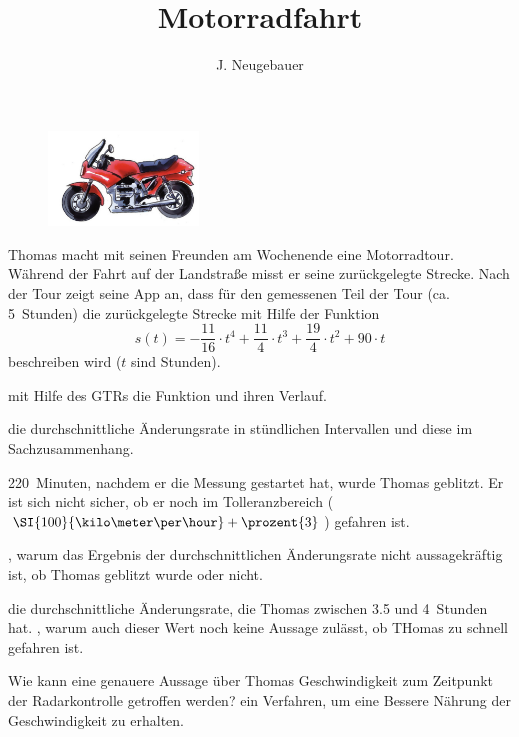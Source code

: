 \documentclass[10pt, a4paper]{scrartcl}
\author{J. Neugebauer}
\title{Motorradfahrt}
\date{\Heute}
\begin{document}
\ReiheTitel

\begin{figure}
	\includegraphics[width=4cm]{EF-AB.8-Abb_Motorrad}
\end{figure}

Thomas macht mit seinen Freunden am Wochenende eine Motorradtour. Während der Fahrt auf der Landstraße misst er seine zurückgelegte Strecke. Nach der Tour zeigt seine App an, dass für den gemessenen Teil der Tour (ca. \SI{5}{Stunden}) die zurückgelegte Strecke mit Hilfe der Funktion
\[ s(t) = -\frac{11}{16}\cdot t^4 + \frac{11}{4}\cdot t^3 + \frac{19}{4}\cdot  t^2 + 90\cdot t  \]
beschreiben wird ($t$ sind \si{Stunden}).

	
\begin{aufgabe}
	\begin{enumeratea}
		\item {} mit Hilfe des GTRs die Funktion und  ihren Verlauf.
		\item {} die durchschnittliche Änderungsrate in stündlichen Intervallen und  diese im Sachzusammenhang.
	\end{enumeratea}
\end{aufgabe}

\begin{aufgabe}
	\SI{220}{Minuten}, nachdem er die Messung gestartet hat, wurde Thomas geblitzt. Er ist sich nicht sicher, ob er noch im Tolleranzbereich ($\SI{100}{\kilo\meter\per\hour} + \prozent{3}$) gefahren ist.

	\begin{enumeratea}
		\item {}, warum das Ergebnis der durchschnittlichen Änderungsrate nicht aussagekräftig ist, ob Thomas geblitzt wurde oder nicht.
		
		\item {} die durchschnittliche Änderungsrate, die Thomas zwischen \num{3,5} und \SI{4}{Stunden}  hat. , warum auch dieser Wert noch keine Aussage zulässt, ob THomas zu schnell gefahren ist.
		
		\item Wie kann eine genauere Aussage über Thomas Geschwindigkeit zum Zeitpunkt der Radarkontrolle getroffen werden?  ein Verfahren, um eine Bessere Nährung der Geschwindigkeit zu erhalten. 
	\end{enumeratea}
\end{aufgabe}
\end{document}
